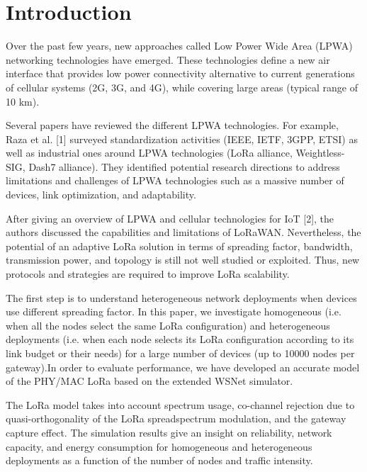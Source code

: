 \section{Introduction} \label{sec:Introduction}

Over the past few years,
	new approaches called Low Power Wide Area (LPWA) networking technologies have emerged.
These technologies define a new air interface that provides low power connectivity alternative to current generations of cellular systems (2G, 3G,
	and 4G),
	while covering large areas (typical range of 10 km).

Several papers have reviewed the different LPWA technologies.
For example,
	Raza et al. [1] surveyed standardization activities (IEEE,
	IETF, 3GPP,
	ETSI) as well as industrial ones around LPWA technologies (LoRa alliance,
	Weightless-SIG,
	Dash7 alliance).
They identified potential research directions to address limitations and challenges of LPWA technologies such as a massive number of devices,
	link optimization,
	and adaptability.

After giving an overview of LPWA and cellular technologies for IoT [2],
	the authors discussed the capabilities and limitations of LoRaWAN.
Nevertheless,
	the potential of an adaptive LoRa solution in terms of spreading factor,
	bandwidth,
	transmission power,
	and topology is still not well studied or exploited.
Thus,
	new protocols and strategies are required to improve LoRa scalability.

The first step is to understand heterogeneous network deployments when devices use different spreading factor.
In this paper,
	we investigate homogeneous (i.e.
when all the nodes select the same LoRa configuration) and heterogeneous deployments (i.e.
when each node selects its LoRa configuration according to its link budget or their needs) for a large number of devices (up to 10000 nodes per gateway).In order to evaluate performance,
	we have developed an accurate model of the PHY/MAC LoRa based on the extended WSNet simulator.

The LoRa model takes into account spectrum usage,
	co-channel rejection due to quasi-orthogonality of the LoRa spreadspectrum modulation,
	and the gateway capture effect.
The simulation results give an insight on reliability,
	network capacity,
	and energy consumption for homogeneous and heterogeneous deployments as a function of the number of nodes and traffic intensity.

